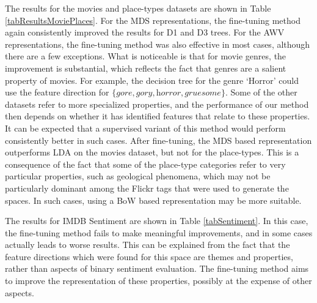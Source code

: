 The results for the movies and place-types datasets are shown in Table \ref{tabResultsMoviePlaces}. For the MDS representations, the fine-tuning method again consistently improved the results for D1 and D3 trees. For the AWV representations, the fine-tuning method was also effective in most cases, although there are a few exceptions. What is noticeable is that for movie genres, the improvement is substantial, which reflects the fact that genres are a salient property of movies. For example, the decision tree for the genre `Horror' could use the feature direction for $\{\textit{gore}, \textit{gory}, \textit{horror}, \textit{gruesome}\}$. Some of the other datasets refer to more specialized properties, and the performance of our method then depends on whether it has identified features that relate to these properties. It can be expected that a supervised variant of this method would perform consistently better in such cases. After fine-tuning, the MDS based representation outperforms LDA on the movies dataset, but not for the place-types. This is a consequence of the fact that some of the place-type categories refer to very particular properties, such as geological phenomena, which may not be particularly dominant among the Flickr tags that were used to generate the spaces. In such cases, using a BoW based representation may be more suitable.

The results for IMDB Sentiment are shown in Table \ref{tabSentiment}. In this case, the fine-tuning method fails to make meaningful improvements, and in some cases actually leads to worse results. This can be explained from the fact that the feature directions which were found for this space are themes and properties, rather than aspects of binary sentiment evaluation. The fine-tuning method aims to improve the representation of these properties, possibly at the expense of other aspects.



